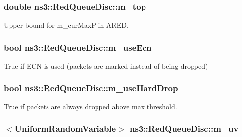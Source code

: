 \subsubsection[{\texorpdfstring{m\+\_\+top}{m_top}}]{\setlength{\rightskip}{0pt plus 5cm}double ns3\+::\+Red\+Queue\+Disc\+::m\+\_\+top\hspace{0.3cm}{\ttfamily [private]}}\hypertarget{classns3_1_1RedQueueDisc_a6df2255795fef0607a0e5ea99d9bf3f3}{}\label{classns3_1_1RedQueueDisc_a6df2255795fef0607a0e5ea99d9bf3f3}


Upper bound for m\+\_\+cur\+MaxP in A\+R\+ED. 

\subsubsection[{\texorpdfstring{m\+\_\+use\+Ecn}{m_useEcn}}]{\setlength{\rightskip}{0pt plus 5cm}bool ns3\+::\+Red\+Queue\+Disc\+::m\+\_\+use\+Ecn\hspace{0.3cm}{\ttfamily [private]}}\hypertarget{classns3_1_1RedQueueDisc_a58b23b6b5bda347f158108859bab4404}{}\label{classns3_1_1RedQueueDisc_a58b23b6b5bda347f158108859bab4404}


True if E\+CN is used (packets are marked instead of being dropped) 

\subsubsection[{\texorpdfstring{m\+\_\+use\+Hard\+Drop}{m_useHardDrop}}]{\setlength{\rightskip}{0pt plus 5cm}bool ns3\+::\+Red\+Queue\+Disc\+::m\+\_\+use\+Hard\+Drop\hspace{0.3cm}{\ttfamily [private]}}\hypertarget{classns3_1_1RedQueueDisc_a4338af4ddd64c4b11b029eb31728d0ba}{}\label{classns3_1_1RedQueueDisc_a4338af4ddd64c4b11b029eb31728d0ba}


True if packets are always dropped above max threshold. 

\subsubsection[{\texorpdfstring{m\+\_\+uv}{m_uv}}]{$<${\bf Uniform\+Random\+Variable}$>$ ns3\+::\+Red\+Queue\+Disc\+::m\+\_\+uv\hspace{0.3cm}{\ttfamily [private]}}\hypertarget{classns3_1_1RedQueueDisc_ac8e5d222b2cbd02e3e940e129f36c76c}{}\label{classns3_1_1RedQueueDisc_ac8e5d222b2cbd02e3e940e129f36c76c}


